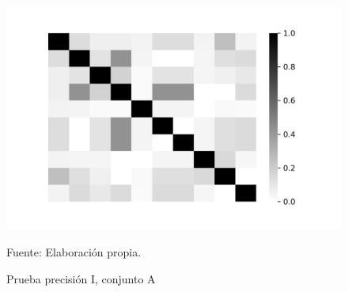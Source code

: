 \begin{figure}[!h]
{\includegraphics[scale=0.41]{images/results/MAP_1275_WIN_W_15_K_5_PRECISION}}
\caption{Prueba precisión I, conjunto A}
Fuente: Elaboración propia.
\label{set_A_precision}
\end{figure}

